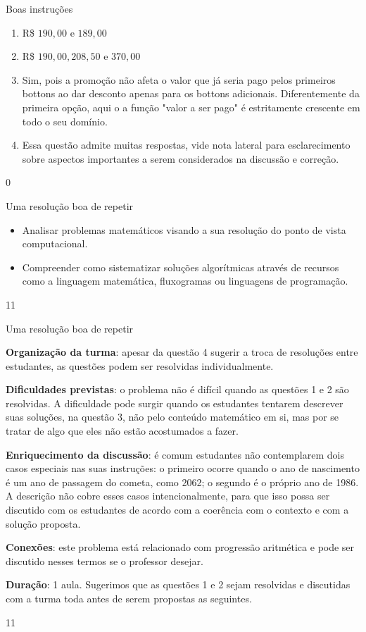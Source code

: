 \begin{answer}{Boas instruções}
{
\begin{enumerate}
\item R\$ $190{,}00\text{ e }189{,}00$

\item R\$ $190{,}00, 208,50\text{ e }370{,}00$

\item Sim, pois a promoção não afeta o valor que já seria pago pelos primeiros bottons ao dar desconto apenas para os bottons adicionais. Diferentemente da primeira opção, aqui o a função "valor a ser pago"{} é estritamente crescente em todo o seu domínio.

\item Essa questão admite muitas respostas, vide nota lateral para esclarecimento sobre aspectos importantes a serem considerados na discussão e correção.
\end{enumerate}
}{0}
\end{answer}
\clearmargin
\marginpar{\vspace{-2em}}
\begin{objectives}{Uma resolução boa de repetir}
{
\begin{itemize}
\item Analisar problemas matemáticos visando a sua resolução do ponto de vista computacional.

\item Compreender como sistematizar soluções algorítmicas através de recursos como a linguagem matemática, fluxogramas ou linguagens de programação.
\end{itemize}
}{1}{1}
\end{objectives}
\begin{sugestions}{Uma resolução boa de repetir}
{
\textbf{Organização da turma}: apesar da questão 4 sugerir a troca de resoluções entre estudantes, as questões podem ser resolvidas individualmente.

\textbf{Dificuldades previstas}: o problema não é difícil quando as questões 1 e 2 são resolvidas. A dificuldade pode surgir quando os estudantes tentarem descrever suas soluções, na questão 3, não pelo conteúdo matemático em si, mas por se tratar de algo que eles não estão acostumados a fazer.

\textbf{Enriquecimento da discussão}: é comum estudantes não contemplarem dois casos especiais nas suas instruções: o primeiro ocorre quando o ano de nascimento é um ano de passagem do cometa, como 2062; o segundo é o próprio ano de 1986. A descrição não cobre esses casos intencionalmente, para que isso possa ser discutido com os estudantes de acordo com a coerência com o contexto e com a solução proposta.

\textbf{Conexões}: este problema está relacionado com progressão aritmética e pode ser discutido nesses termos se o professor desejar.

\textbf{Duração}: 1 aula. Sugerimos que as questões 1 e 2 sejam resolvidas e discutidas com a turma toda antes de serem propostas as seguintes.
}{1}{1}
\end{sugestions}
